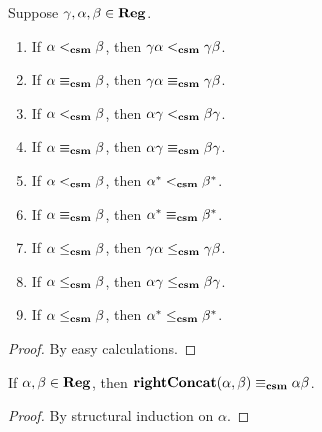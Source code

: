 \begin{lemma}
\label{CSMContexts}
Suppose $\gamma,\alpha,\beta\in\mathbf{Reg}$.
\begin{enumerate}[\quad(1)]
\item If $\alpha\mathrel{<_{\mathbf{csm}}}\beta$, then $\gamma\alpha\mathrel{<_{\mathbf{csm}}}\gamma\beta$.
\item If $\alpha\mathrel{\equiv_{\mathbf{csm}}}\beta$, then $\gamma\alpha\mathrel{\equiv_{\mathbf{csm}}}\gamma\beta$.
\item If $\alpha\mathrel{<_{\mathbf{csm}}}\beta$, then $\alpha\gamma\mathrel{<_{\mathbf{csm}}}\beta\gamma$.
\item If $\alpha\mathrel{\equiv_{\mathbf{csm}}}\beta$, then $\alpha\gamma\mathrel{\equiv_{\mathbf{csm}}}\beta\gamma$.
\item If $\alpha\mathrel{<_{\mathbf{csm}}}\beta$, then $\alpha^*\mathrel{<_{\mathbf{csm}}}\beta^*$.
\item If $\alpha\mathrel{\equiv_{\mathbf{csm}}}\beta$, then $\alpha^*\mathrel{\equiv_{\mathbf{csm}}}\beta^*$.
\item If $\alpha\mathrel{\leq_{\mathbf{csm}}}\beta$, then $\gamma\alpha\mathrel{\leq_{\mathbf{csm}}}\gamma\beta$.
\item If $\alpha\mathrel{\leq_{\mathbf{csm}}}\beta$, then $\alpha\gamma\mathrel{\leq_{\mathbf{csm}}}\beta\gamma$.
\item If $\alpha\mathrel{\leq_{\mathbf{csm}}}\beta$, then $\alpha^*\mathrel{\leq_{\mathbf{csm}}}\beta^*$.
\end{enumerate}
\end{lemma}

\begin{proof}
By easy calculations.
\end{proof}

\begin{lemma}
\label{RightConcatCSM}
If $\alpha,\beta\in\mathbf{Reg}$, then
$\mathbf{rightConcat}(\alpha,\beta)\mathrel{\equiv_{\mathbf{csm}}}\alpha\beta$.
\end{lemma}

\begin{proof}
By structural induction on $\alpha$.
\end{proof}

